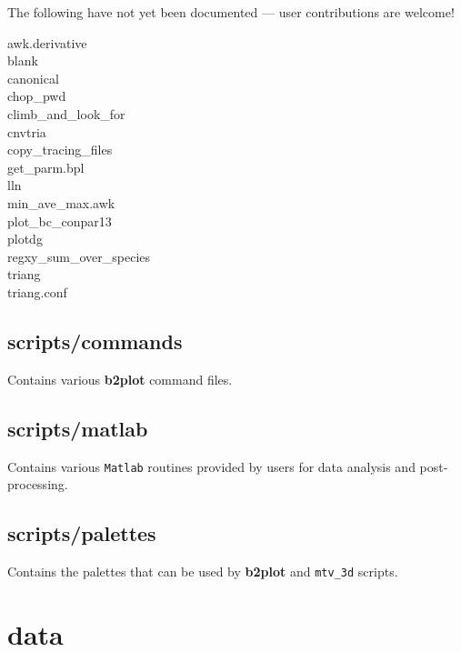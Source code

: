 \documentclass[a4paper,10pt]{report}
\newcommand{\btwoplot}{{\bf b2plot} }
\begin{document}
The following have not yet been documented --- user contributions are
welcome!
\begin{description}
  \item[awk.derivative]
  \item[blank]
  \item[canonical]
  \item[chop\_pwd]
  \item[climb\_and\_look\_for]
  \item[cnvtria]
  \item[copy\_tracing\_files]
  \item[get\_parm.bpl]
  \item[lln]
  \item[min\_ave\_max.awk]
  \item[plot\_bc\_conpar13]
  \item[plotdg]
  \item[regxy\_sum\_over\_species]
  \item[triang]
  \item[triang.conf]
\end{description}

\subsection{scripts/commands}

Contains various \btwoplot command files.

\subsection{scripts/matlab}

Contains various {\tt Matlab} routines provided by users for data analysis and post-processing.

\subsection{scripts/palettes}

Contains the palettes that can be used by \btwoplot and {\tt mtv\_3d} scripts.

\newpage\section{data}
\end{document}
